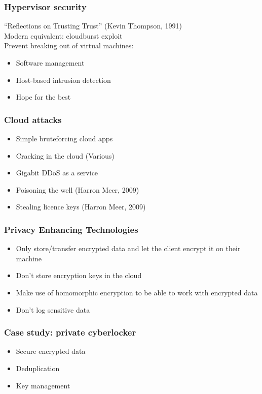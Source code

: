 \documentclass{beamer}
\begin{document}
\begin{frame}
    \frametitle{Hypervisor security}
    ``Reflections on Trusting Trust'' (Kevin Thompson, 1991) \\
    Modern equivalent: cloudburst exploit \\
    Prevent breaking out of virtual machines:
    \begin{itemize}
      \item Software management
      \item Host-based intrusion detection
      \item Hope for the best
    \end{itemize}
\end{frame}

\begin{frame}
    \frametitle{Cloud attacks}
    \begin{itemize}
      \item Simple bruteforcing cloud apps
      \item Cracking in the cloud (Various) %
      \item Gigabit DDoS as a service %
      \item Poisoning the well (Harron Meer, 2009)
      \item Stealing licence keys (Harron Meer, 2009)
    \end{itemize}
\end{frame}

\begin{frame}
    \frametitle{Privacy Enhancing Technologies}
    \begin{itemize}
      \item Only store/transfer encrypted data and let the client encrypt it on their machine
      \item Don't store encryption keys in the cloud
      \item Make use of homomorphic encryption to be able to work with encrypted data
      \item Don't log sensitive data
    \end{itemize}
\end{frame}

\begin{frame}
    \frametitle{Case study: private cyberlocker}
    \begin{itemize}
    \item Secure encrypted data
    \item Deduplication
    \item Key management
    \end{itemize}
\end{frame}
\end{document}
